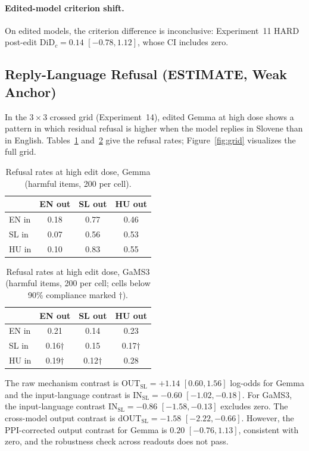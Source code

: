 \documentclass[11pt,letterpaper]{article}
\begin{document}
\paragraph{Edited-model criterion shift.}
On edited models, the criterion difference is inconclusive: Experiment~11 HARD post-edit $\mathrm{DiD}_c = 0.14$ $[-0.78, 1.12]$, whose CI includes zero.

\subsection{Reply-Language Refusal (ESTIMATE, Weak Anchor)}
\label{sec:reply}

In the $3{\times}3$ crossed grid (Experiment~14), edited Gemma at high dose shows a pattern in which residual refusal is higher when the model replies in Slovene than in English.
Tables~\ref{tab:gemma_grid} and~\ref{tab:gams3_grid} give the refusal rates; Figure~\ref{fig:grid} visualizes the full grid.

\begin{table}[!htbp]
\centering
\caption{Refusal rates at high edit dose, Gemma (harmful items, 200 per cell).}
\label{tab:gemma_grid}
\begin{tabular}{lccc}
\toprule
 & EN out & SL out & HU out \\
\midrule
EN in & 0.18 & 0.77 & 0.46 \\
SL in & 0.07 & 0.56 & 0.53 \\
HU in & 0.10 & 0.83 & 0.55 \\
\bottomrule
\end{tabular}
\end{table}

\begin{table}[!htbp]
\centering
\caption{Refusal rates at high edit dose, GaMS3 (harmful items, 200 per cell; cells below 90\% compliance marked $\dag$).}
\label{tab:gams3_grid}
\begin{tabular}{lccc}
\toprule
 & EN out & SL out & HU out \\
\midrule
EN in & 0.21 & 0.14 & 0.23 \\
SL in & 0.16$\dag$ & 0.15 & 0.17$\dag$ \\
HU in & 0.19$\dag$ & 0.12$\dag$ & 0.28 \\
\bottomrule
\end{tabular}
\end{table}

The raw mechanism contrast is $\mathrm{OUT}_{\mathrm{SL}} = +1.14$ $[0.60, 1.56]$ log-odds for Gemma and the input-language contrast is $\mathrm{IN}_{\mathrm{SL}} = -0.60$ $[-1.02, -0.18]$.
For GaMS3, the input-language contrast $\mathrm{IN}_{\mathrm{SL}} = -0.86$ $[-1.58, -0.13]$ excludes zero.
The cross-model output contrast is $\mathrm{dOUT}_{\mathrm{SL}} = -1.58$ $[-2.22, -0.66]$.
However, the PPI-corrected output contrast for Gemma is $0.20$ $[-0.76, 1.13]$, consistent with zero, and the robustness check across readouts does not pass.
\end{document}
